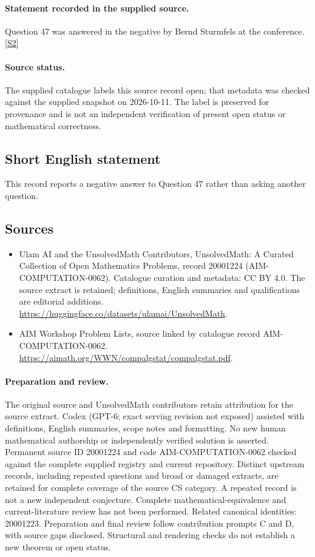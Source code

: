 \documentclass[11pt]{article}
\begin{document}
\paragraph{Statement recorded in the supplied source.}
Question 47 was answered in the negative by Bernd Sturmfels at the conference. \href{https://aimath.org/WWN/compalgstat/compalgstat.pdf}{[S2]}
\paragraph{Source status.}
The supplied catalogue labels this source record open; that metadata was checked against the supplied snapshot on 2026-10-11. The label is preserved for provenance and is not an independent verification of present open status or mathematical correctness.
\subsection{Short English statement}
This record reports a negative answer to Question 47 rather than asking another question.
\subsection{Sources}
\begin{itemize}
\item[S1] Ulam AI and the UnsolvedMath Contributors, UnsolvedMath: A Curated Collection of Open Mathematics Problems, record 20001224 (AIM-COMPUTATION-0062). Catalogue curation and metadata: CC BY 4.0. The source extract is retained; definitions, English summaries and qualifications are editorial additions.
\url{https://huggingface.co/datasets/ulamai/UnsolvedMath}.
\item[S2] AIM Workshop Problem Lists, source linked by catalogue record AIM-COMPUTATION-0062.
\url{https://aimath.org/WWN/compalgstat/compalgstat.pdf}.
\end{itemize}
\paragraph{Preparation and review.}
The original source and UnsolvedMath contributors retain attribution for the source extract. Codex (GPT-6; exact serving revision not exposed) assisted with definitions, English summaries, scope notes and formatting. No new human mathematical authorship or independently verified solution is asserted. Permanent source ID 20001224 and code AIM-COMPUTATION-0062 checked against the complete supplied registry and current repository. Distinct upstream records, including repeated questions and broad or damaged extracts, are retained for complete coverage of the source CS category. A repeated record is not a new independent conjecture. Complete mathematical-equivalence and current-literature review has not been performed. Related canonical identities: 20001223. Preparation and final review follow contribution prompts C and D, with source gaps disclosed. Structural and rendering checks do not establish a new theorem or open status.
\label{end:20001224}
\end{document}

